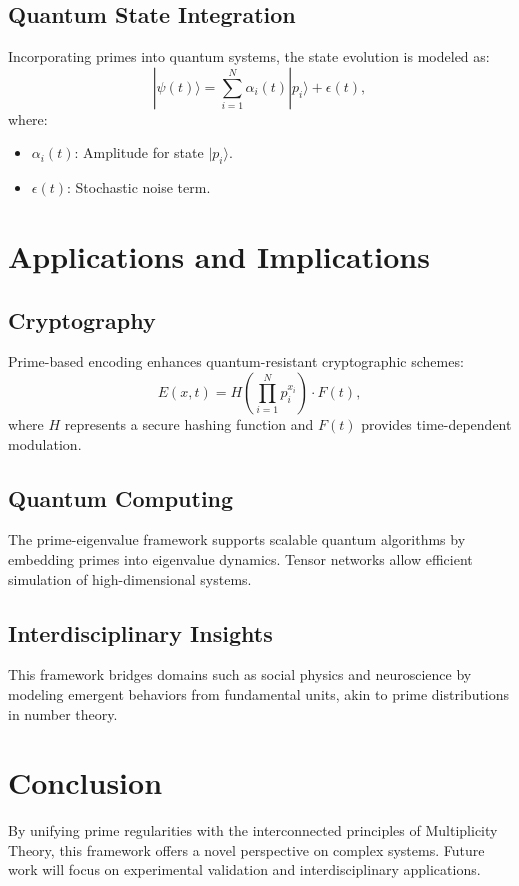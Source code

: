 \documentclass[11pt]{article}
\begin{document}
\subsection{Quantum State Integration}
Incorporating primes into quantum systems, the state evolution is modeled as:
\begin{equation}
|\psi(t)\rangle = \sum_{i=1}^N \alpha_i(t) |p_i\rangle + \epsilon(t),
\end{equation}
where:
\begin{itemize}
    \item $\alpha_i(t)$: Amplitude for state $|p_i\rangle$.
    \item $\epsilon(t)$: Stochastic noise term.
\end{itemize}

\section{Applications and Implications}

\subsection{Cryptography}
Prime-based encoding enhances quantum-resistant cryptographic schemes:
\begin{equation}
E(x,t) = H\left(\prod_{i=1}^N p_i^{x_i}\right) \cdot F(t),
\end{equation}
where $H$ represents a secure hashing function and $F(t)$ provides time-dependent modulation.

\subsection{Quantum Computing}
The prime-eigenvalue framework supports scalable quantum algorithms by embedding primes into eigenvalue dynamics. Tensor networks allow efficient simulation of high-dimensional systems.

\subsection{Interdisciplinary Insights}
This framework bridges domains such as social physics and neuroscience by modeling emergent behaviors from fundamental units, akin to prime distributions in number theory.

\section{Conclusion}
By unifying prime regularities with the interconnected principles of Multiplicity Theory, this framework offers a novel perspective on complex systems. Future work will focus on experimental validation and interdisciplinary applications.
\end{document}
